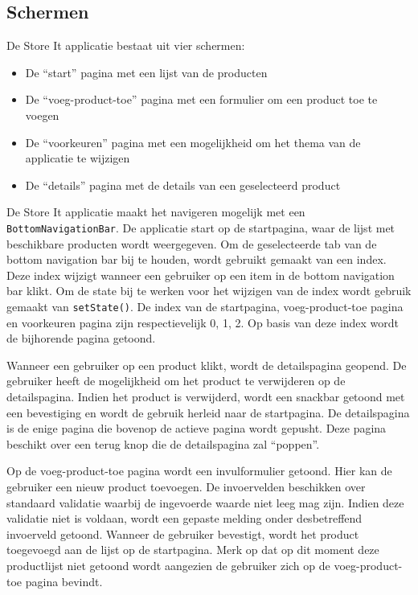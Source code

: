 \subsection*{Schermen}
De Store It applicatie bestaat uit vier schermen: 
\begin{itemize}
    \item De ``start'' pagina met een lijst van de producten
    \item De ``voeg-product-toe'' pagina met een formulier om een product toe te voegen
    \item De ``voorkeuren'' pagina met een mogelijkheid om het thema van de applicatie te wijzigen
    \item De ``details'' pagina met de details van een geselecteerd product
\end{itemize}

De Store It applicatie maakt het navigeren mogelijk met een \verb|BottomNavigationBar|. De applicatie start op de startpagina, waar de lijst met beschikbare producten wordt weergegeven. Om de geselecteerde tab van de bottom navigation bar bij te houden, wordt gebruikt gemaakt van een index. Deze index wijzigt wanneer een gebruiker op een item in de bottom navigation bar klikt. Om de state bij te werken voor het wijzigen van de index wordt gebruik gemaakt van \verb|setState()|. De index van de startpagina, voeg-product-toe pagina en voorkeuren pagina zijn respectievelijk 0, 1, 2.
Op basis van deze index wordt de bijhorende pagina getoond.

Wanneer een gebruiker op een product klikt, wordt de detailspagina geopend. \newline
De gebruiker heeft de mogelijkheid om het product te verwijderen op de detailspagina. Indien het product is verwijderd, wordt een snackbar getoond met een bevestiging en wordt de gebruik herleid naar de startpagina.
De detailspagina is de enige pagina die bovenop de actieve pagina wordt gepusht. Deze pagina beschikt over een terug knop die de detailspagina zal ``poppen''.

Op de voeg-product-toe pagina wordt een invulformulier getoond. Hier kan de gebruiker een nieuw product toevoegen. De invoervelden beschikken over standaard validatie waarbij de ingevoerde waarde niet leeg mag zijn. Indien deze validatie niet is voldaan, wordt een gepaste melding onder desbetreffend invoerveld getoond. \newline
Wanneer de gebruiker bevestigt, wordt het product toegevoegd aan de lijst op de startpagina. Merk op dat op dit moment deze productlijst niet getoond wordt aangezien de gebruiker zich op de voeg-product-toe pagina bevindt.

